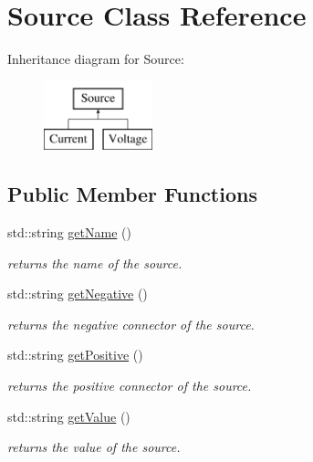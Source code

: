 \hypertarget{class_s_p_i_c_e_1_1_source}{}\section{Source Class Reference}
\label{class_s_p_i_c_e_1_1_source}
Inheritance diagram for Source\+:\begin{figure}[H]
\begin{center}
\leavevmode
\includegraphics[height=2.000000cm]{class_s_p_i_c_e_1_1_source}
\end{center}
\end{figure}
\subsection*{Public Member Functions}
\begin{DoxyCompactItemize}
\item 
\mbox{\label{class_s_p_i_c_e_1_1_source_ac0fc966d4386ddb71d99361e3fccb311}} 
std\+::string \hyperlink{class_s_p_i_c_e_1_1_source_ac0fc966d4386ddb71d99361e3fccb311}{get\+Name} ()
\begin{DoxyCompactList}\small\item\em returns the name of the source. \end{DoxyCompactList}\item 
\mbox{\label{class_s_p_i_c_e_1_1_source_a8b4ab73ed1d99c533aa22af0a37ebb0d}} 
std\+::string \hyperlink{class_s_p_i_c_e_1_1_source_a8b4ab73ed1d99c533aa22af0a37ebb0d}{get\+Negative} ()
\begin{DoxyCompactList}\small\item\em returns the negative connector of the source. \end{DoxyCompactList}\item 
\mbox{\label{class_s_p_i_c_e_1_1_source_a1adb347b9a2c2da556e4417ab0eec0e1}} 
std\+::string \hyperlink{class_s_p_i_c_e_1_1_source_a1adb347b9a2c2da556e4417ab0eec0e1}{get\+Positive} ()
\begin{DoxyCompactList}\small\item\em returns the positive connector of the source. \end{DoxyCompactList}\item 
\mbox{\label{class_s_p_i_c_e_1_1_source_a4c052cb2622c580a250b2c783a436882}} 
std\+::string \hyperlink{class_s_p_i_c_e_1_1_source_a4c052cb2622c580a250b2c783a436882}{get\+Value} ()
\begin{DoxyCompactList}\small\item\em returns the value of the source. \end{DoxyCompactList}\end{DoxyCompactItemize}
